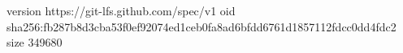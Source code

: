 version https://git-lfs.github.com/spec/v1
oid sha256:fb287b8d3cba53f0ef92074ed1ceb0fa8ad6bfdd6761d1857112fdcc0dd4fdc2
size 349680
